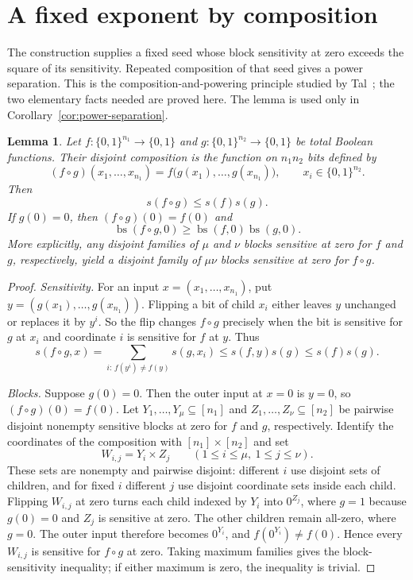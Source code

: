 \documentclass[11pt]{article}
\newcommand{\bs}{\operatorname{bs}}
\newtheorem{lemma}[theorem]{Lemma}
\theoremstyle{definition}
\theoremstyle{remark}
\begin{document}
\section{A fixed exponent by composition}
\label{sec:composition}

The construction supplies a fixed seed whose block sensitivity at zero exceeds
the square of its sensitivity. Repeated composition of that seed gives a power
separation. This is the composition-and-powering principle studied by
Tal~\cite{Tal2013}; the two elementary facts needed are proved here. The lemma
is used only in Corollary~\ref{cor:power-separation}.

\begin{lemma}
\label{lem:composition}
Let $f:\{0,1\}^{n_1}\to\{0,1\}$ and
$g:\{0,1\}^{n_2}\to\{0,1\}$ be total Boolean functions.
Their disjoint composition is the function on $n_1n_2$ bits defined by
\[
 (f\circ g)(x_1,\ldots,x_{n_1})
   =f\bigl(g(x_1),\ldots,g(x_{n_1})\bigr),
 \qquad x_i\in\{0,1\}^{n_2}.
\]
Then
\[
 s(f\circ g)\leq s(f)s(g).
\]
If $g(0)=0$, then $(f\circ g)(0)=f(0)$ and
\[
 \bs(f\circ g,0)\geq\bs(f,0)\bs(g,0).
\]
More explicitly, any disjoint families of $\mu$ and $\nu$ blocks sensitive at
zero for $f$ and $g$, respectively, yield a disjoint family of $\mu\nu$ blocks
sensitive at zero for $f\circ g$.
\end{lemma}

\begin{proof}
\emph{Sensitivity.} For an input \(x=(x_1,\ldots,x_{n_1})\), put
\(y=(g(x_1),\ldots,g(x_{n_1}))\). Flipping a bit of child \(x_i\) either
leaves \(y\) unchanged or replaces it by \(y^{i}\). So the flip changes
\(f\circ g\) precisely when the bit is sensitive for \(g\) at \(x_i\) and
coordinate \(i\) is sensitive for \(f\) at \(y\). Thus
\[
 s(f\circ g,x)
   =\sum_{i:\,f(y^{i})\ne f(y)}s(g,x_i)
   \leq s(f,y)s(g)
   \leq s(f)s(g).
\]

\emph{Blocks.} Suppose \(g(0)=0\). Then the outer input at \(x=0\) is
\(y=0\), so \((f\circ g)(0)=f(0)\). Let \(Y_1,\ldots,Y_\mu\subseteq[n_1]\) and
\(Z_1,\ldots,Z_\nu\subseteq[n_2]\) be pairwise disjoint nonempty sensitive
blocks at zero for \(f\) and \(g\), respectively. Identify the coordinates of
the composition with \([n_1]\times[n_2]\) and set
\[
 W_{i,j}=Y_i\times Z_j\qquad(1\le i\le\mu,\ 1\le j\le\nu).
\]
These sets are nonempty and pairwise disjoint: different \(i\) use disjoint
sets of children, and for fixed \(i\) different \(j\) use disjoint coordinate
sets inside each child. Flipping \(W_{i,j}\) at zero turns each child indexed
by \(Y_i\) into \(0^{Z_j}\), where \(g=1\) because \(g(0)=0\) and \(Z_j\) is
sensitive at zero. The other children remain all-zero, where \(g=0\).
The outer input therefore becomes \(0^{Y_i}\), and \(f(0^{Y_i})\ne f(0)\).
Hence every \(W_{i,j}\) is sensitive for \(f\circ g\) at zero.
Taking maximum families gives the block-sensitivity inequality; if either
maximum is zero, the inequality is trivial.
\end{proof}
\end{document}
